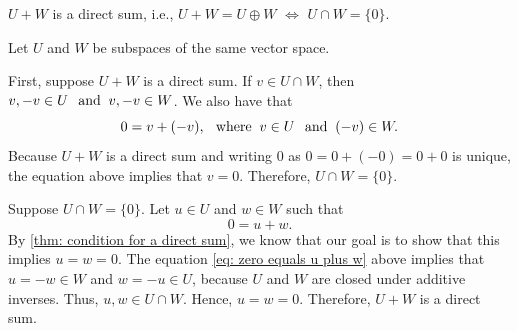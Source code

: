 \setcounter{thm}{45}
\begin{thm} 
  \label{thm: sum and intersection of two subspaces}
  $U+W$ is a direct sum, i.e., $U+W = U \oplus W$ $\iff$ $U \cap W = \{0\}$.
\end{thm}
\begin{prf} Let $U$ and $W$ be subspaces of the same vector space.
  \begin{description}
    \item{\Rightarrowdirection} First, suppose $U+W$ is a direct sum. If $v \in U \cap W$, then $v, -v \in U \;\;\, \text{and}\;\; v, -v \in W$. We also have that
    \begin{equation}
      0 = v + (-v), \;\;\, \text{where}\;\; v\in U \;\;\, \text{and}\;\; (-v) \in W.
    \end{equation}
    Because $U+W$ is a direct sum and writing $0$ as $0 = 0+(-0)=0+0$ is unique, the equation above implies that $v=0$. Therefore, $U \cap W = \{0\}$.

    \item{\Leftarrowdirection} Suppose $U\cap W = \{0\}$. Let $u\in U$ and $w \in W$ such that
    \begin{equation}
      \label{eq: zero equals u plus w}
      0 = u+w.
    \end{equation}
    By \ref{thm: condition for a direct sum}, we know that our goal is to show that this implies $u=w=0$. The equation \eqref{eq: zero equals u plus w} above implies that $u=-w\in W$ and $w=-u \in U$, because $U$ and $W$ are closed under additive inverses. Thus, $u,w \in U\cap W$. Hence, $u=w=0$. Therefore, $U+W$ is a direct sum.
  \end{description}
  \vspace{-\baselineskip}
\end{prf}

